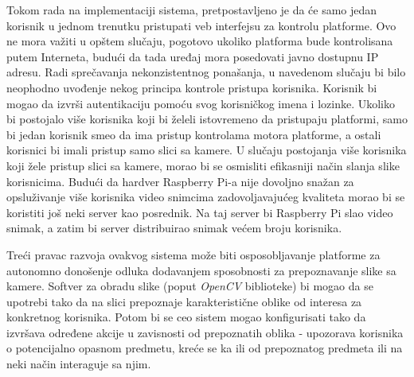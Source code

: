 \documentclass[12pt,a4paper]{report}
\begin{document}
Tokom rada na implementaciji sistema, pretpostavljeno je da će samo jedan korisnik u jednom trenutku pristupati veb interfejsu za kontrolu platforme. Ovo ne mora važiti u opštem slučaju, pogotovo ukoliko platforma bude kontrolisana putem Interneta, budući da tada uređaj mora posedovati javno dostupnu IP adresu. Radi sprečavanja nekonzistentnog ponašanja, u navedenom slučaju bi bilo neophodno uvođenje nekog principa kontrole pristupa korisnika. Korisnik bi mogao da izvrši autentikaciju pomoću svog korisničkog imena i lozinke. Ukoliko bi postojalo više korisnika koji bi želeli istovremeno da pristupaju platformi, samo bi jedan korisnik smeo da ima pristup kontrolama motora platforme, a ostali korisnici bi imali pristup samo slici sa kamere. U slučaju postojanja više korisnika koji žele pristup slici sa kamere, morao bi se osmisliti efikasniji način slanja slike korisnicima. Budući da hardver Raspberry Pi-a nije dovoljno snažan za opsluživanje više korisnika video snimcima zadovoljavajućeg kvaliteta morao bi se koristiti još neki server kao posrednik. Na taj server bi Raspberry Pi slao video snimak, a zatim bi server distribuirao snimak većem broju korisnika.

Treći pravac razvoja ovakvog sistema može biti osposobljavanje platforme za autonomno donošenje odluka dodavanjem sposobnosti za prepoznavanje slike sa kamere. Softver za obradu slike (poput \emph{OpenCV} biblioteke) bi mogao da se upotrebi tako da na slici prepoznaje karakteristične oblike od interesa za konkretnog korisnika. Potom bi se ceo sistem mogao konfigurisati tako da izvršava određene akcije u zavisnosti od prepoznatih oblika - upozorava korisnika o potencijalno opasnom predmetu, kreće se ka ili od prepoznatog predmeta ili na neki način interaguje sa njim. 

\newpage
\end{document}
